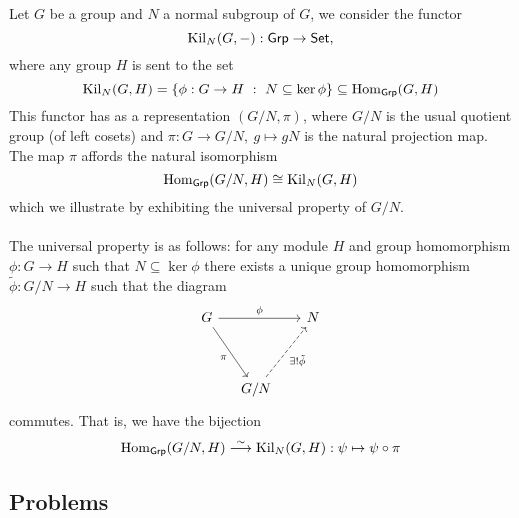 \begin{example}\label{quotkill}
Let $G$ be a group and $N$ a normal subgroup of $G$, we consider the functor
\[\mathrm{Kil}_N(G,-):\mathsf{Grp} \to \mathsf{Set},\]
where any group $H$ is sent to the set
\[\mathrm{Kil}_N(G,H) = \left\{\phi:G \to H\ :\ N \subseteq \ker\phi\right\} \subseteq \mathrm{Hom}_{\mathsf{Grp}}(G,H)\]
This functor has as a representation $(G/N,\pi)$, where $G/N$ is the usual quotient group (of left cosets) and $\pi: G \to G/N,\ g \mapsto gN$ is the natural projection map. The map $\pi$ affords the natural isomorphism
\[\mathrm{Hom}_{\mathsf{Grp}}(G/N,H) \cong \mathrm{Kil}_N(G,H)\]
which we illustrate by exhibiting the universal property of $G/N$.\\
\\
The universal property is as follows: for any module $H$ and group homomorphism $\phi:G \to H$ such that $N \subseteq \ker\phi$ there exists a unique group homomorphism $\tilde{\phi}:G/N \to H$ such that the diagram
\[\begin{tikzcd}[row sep=huge, column sep=small]
G \arrow[rr, "\phi"]\arrow[rd, "\pi"']         & &[0.5em] N \\
 & G/N \arrow[ur, "\exists!\tilde{\phi}"', dashed] &
\end{tikzcd}\]
commutes. That is, we have the bijection
\[\mathrm{Hom}_{\mathsf{Grp}}(G/N,H) \overset{\sim}{\longrightarrow} \mathrm{Kil}_N(G,H):\psi \mapsto \psi\circ\pi\]
\end{example}

\vspace*{0.2in}

\subsection{Problems}
\vspace{0.1in}

